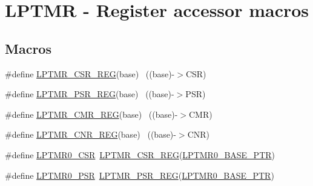 \hypertarget{group___l_p_t_m_r___register___accessor___macros}{}\section{L\+P\+T\+MR -\/ Register accessor macros}
\label{group___l_p_t_m_r___register___accessor___macros}
\subsection*{Macros}
\begin{DoxyCompactItemize}
\item 
\#define \hyperlink{group___l_p_t_m_r___register___accessor___macros_ga10321db77b5ec14e5985fe94395f437d}{L\+P\+T\+M\+R\+\_\+\+C\+S\+R\+\_\+\+R\+EG}(base)                                        ~((base)-\/$>$C\+SR)
\item 
\#define \hyperlink{group___l_p_t_m_r___register___accessor___macros_gaecd9b9ac7bad67f904628f9ecc653285}{L\+P\+T\+M\+R\+\_\+\+P\+S\+R\+\_\+\+R\+EG}(base)                                        ~((base)-\/$>$P\+SR)
\item 
\#define \hyperlink{group___l_p_t_m_r___register___accessor___macros_ga7a7ca80913d5f4e2ceed4be05272267a}{L\+P\+T\+M\+R\+\_\+\+C\+M\+R\+\_\+\+R\+EG}(base)                                        ~((base)-\/$>$C\+MR)
\item 
\#define \hyperlink{group___l_p_t_m_r___register___accessor___macros_gac2f4b2b992990404896f3b23f4d666cb}{L\+P\+T\+M\+R\+\_\+\+C\+N\+R\+\_\+\+R\+EG}(base)                                        ~((base)-\/$>$C\+NR)
\item 
\#define \hyperlink{group___l_p_t_m_r___register___accessor___macros_ga92117617fde3b4150e2c04e6f828f565}{L\+P\+T\+M\+R0\+\_\+\+C\+SR}~\hyperlink{group___l_p_t_m_r___register___accessor___macros_ga10321db77b5ec14e5985fe94395f437d}{L\+P\+T\+M\+R\+\_\+\+C\+S\+R\+\_\+\+R\+EG}(\hyperlink{group___l_p_t_m_r___peripheral_ga90a9194151ad11b422bcab162e797eda}{L\+P\+T\+M\+R0\+\_\+\+B\+A\+S\+E\+\_\+\+P\+TR})
\item 
\#define \hyperlink{group___l_p_t_m_r___register___accessor___macros_ga69b40af8e215d5b29b3f9677d7f8d632}{L\+P\+T\+M\+R0\+\_\+\+P\+SR}~\hyperlink{group___l_p_t_m_r___register___accessor___macros_gaecd9b9ac7bad67f904628f9ecc653285}{L\+P\+T\+M\+R\+\_\+\+P\+S\+R\+\_\+\+R\+EG}(\hyperlink{group___l_p_t_m_r___peripheral_ga90a9194151ad11b422bcab162e797eda}{L\+P\+T\+M\+R0\+\_\+\+B\+A\+S\+E\+\_\+\+P\+TR})

\end{DoxyCompactItemize}
